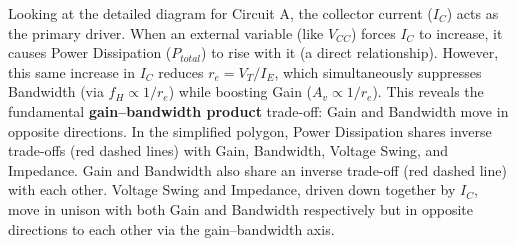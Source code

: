 \documentclass[11pt, a4paper]{article}
\begin{document}

Looking at the detailed diagram for Circuit A, the collector current ($I_C$) acts as the primary driver. When an external variable (like $V_{CC}$) forces $I_C$ to increase, it causes Power Dissipation ($P_{total}$) to rise with it (a direct relationship). However, this same increase in $I_C$ reduces $r_e = V_T/I_E$, which simultaneously suppresses Bandwidth (via $f_H \propto 1/r_e$) while boosting Gain ($A_v \propto 1/r_e$). This reveals the fundamental \textbf{gain--bandwidth product} trade-off: Gain and Bandwidth move in opposite directions. In the simplified polygon, Power Dissipation shares inverse trade-offs (red dashed lines) with Gain, Bandwidth, Voltage Swing, and Impedance. Gain and Bandwidth also share an inverse trade-off (red dashed line) with each other. Voltage Swing and Impedance, driven down together by $I_C$, move in unison with both Gain and Bandwidth respectively but in opposite directions to each other via the gain--bandwidth axis.
\end{document}
